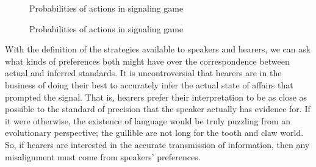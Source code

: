 \begin{figure}
\begin{center}
\end{center}
\caption{Probabilities of actions in signaling game}
\label{probs}
\end{figure}

\begin{figure}
\begin{center}
\end{center}
\caption{Probabilities of actions in signaling game}
\end{figure}



With the definition of the strategies available to speakers and hearers, we can ask what kinds of preferences both might have over the correspondence between actual and inferred standards. It is uncontroversial that hearers are in the business of doing their best to accurately infer the actual state of affairs that prompted the signal. That is, hearers prefer their interpretation to be as close as possible to the standard of precision that the speaker actually has evidence for.  If it were otherwise, the existence of language would be truly puzzling from an evolutionary perspective; the gullible are not long for the tooth and claw world. So, if hearers are interested in the accurate transmission of information, then any misalignment must come from speakers' preferences. 

